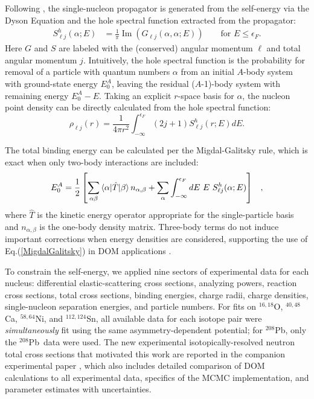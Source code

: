 \documentclass[twocolumn,secnumarabic,amssymb, nobibnotes, aps, prl, superscriptaddress, nobalancelastpage]{revtex4-1}
\newcommand{\oSixEight}{\ensuremath{^{16,18}}O}
\newcommand{\caAughtEight}{\ensuremath{^{40,48}}C\lowercase{a}}
\newcommand{\niEightFour}{\ensuremath{^{58,64}}N\lowercase{i}}
\newcommand{\snTwelveFour}{\ensuremath{^{112,124}}S\lowercase{n}}
\newcommand{\pbEight}{\ensuremath{^{208}}P\lowercase{b}}
\begin{document}
Following \cite{MBTE}, the single-nucleon propagator is generated from the
self-energy via the Dyson Equation and the hole spectral function
extracted from the propagator:
\begin{equation}
    \begin{split}
        S_{\ell j}^{h}(\alpha; E) & =
        \frac{1}{\pi}\operatorname{Im}({G_{\ell j}(\alpha,\alpha;E)})\qquad \text{for }
        E\leq\epsilon_{F}.
    \end{split}
\end{equation}
Here $G$ and $S$ are labeled with the (conserved) 
angular momentum $\ell$ and total angular momentum $j$. Intuitively, the hole spectral function
is the probability for removal of a particle with quantum numbers $\alpha$ from an initial $A$-body system
with ground-state energy $E^{A}_{0}$, leaving the residual ($A$-1)-body system with remaining energy
$E^{A}_{0}-E$. Taking an explicit $r$-space basis for $\alpha$, the nucleon point density can be directly
calculated from the hole spectral function:
\begin{equation} \label{PointDensityEquation}
    \rho_{\ell j}(r) = \frac{1}{4\pi r^{2}} \int_{-\infty}^{\epsilon_{F}} (2j+1) S_{\ell j}^{h}(r; E)
dE.
\end{equation}

The total binding energy can be calculated per the Migdal-Galitsky rule, which is exact
when only two-body interactions are included:
\begin{equation} \label{MigdalGalitsky}
    \begin{split}
        E^{A}_{0} & = \frac{1}{2} \left[\sum_{\alpha\beta}\braket{\alpha|\hat{T}|\beta}n_{\alpha,\beta}
        + \sum_{\alpha}\int_{-\infty}^{\epsilon_{F}}dE\ E\ S_{\ell j}^{h}(\alpha;E)\right]
    \end{split},
\end{equation}
where $\hat{T}$ is the kinetic energy operator appropriate for the
single-particle basis and $n_{\alpha,\beta}$ is the one-body density matrix.
Three-body terms do not induce important corrections when energy densities
are considered, supporting the use of Eq.(\ref{MigdalGalitsky}) in DOM applications
\cite{Atkinson2020_2}.

To constrain the self-energy, we applied nine sectors of experimental data for each nucleus: differential
elastic-scattering cross sections, analyzing powers, reaction cross sections, total cross sections,
binding energies, charge radii, charge densities,
single-nucleon separation energies, and particle numbers. For fits on \oSixEight,
\caAughtEight, \niEightFour, and \snTwelveFour, all available data for each isotope pair were
\textit{simultaneously} fit using the same asymmetry-dependent potential; for \pbEight, only the \pbEight\ data
were used. The new experimental isotopically-resolved neutron total
cross sections that motivated this work are reported in the companion experimental
paper \cite{Pruitt2020PRC}, which also includes detailed comparison of
DOM calculations to all experimental data, specifics of the MCMC implementation, and parameter
estimates with uncertainties.
\end{document}
